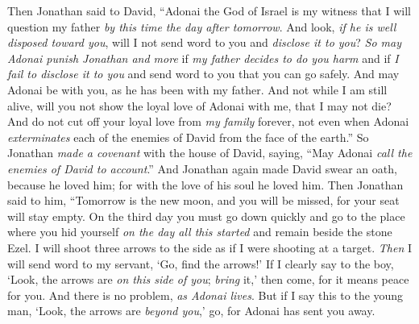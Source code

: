 \begin{biblechapter}
\verse Then Jonathan said to David, “Adonai the God of Israel is my witness that I will question my father \textit{by this time the day after tomorrow}. And look, \textit{if he is well disposed toward you}, will I not send word to you and \textit{disclose it to you}?
\verse \textit{So may Adonai punish Jonathan and more} if \textit{my father decides to do you harm} and if \textit{I fail to disclose it to you} and send word to you that you can go safely. And may Adonai be with you, as he has been with my father.
\verse And not while I am still alive, will you not show the loyal love of Adonai with me, that I may not die?
\verse And do not cut off your loyal love from \textit{my family} forever, not even when Adonai \textit{exterminates} each of the enemies of David from the face of the earth.”
\verse So Jonathan \textit{made a covenant} with the house of David, saying, “May Adonai \textit{call the enemies of David to account}.”
\verse And Jonathan again made David swear an oath, because he loved him; for with the love of his soul he loved him.
\verse Then Jonathan said to him, “Tomorrow is the new moon, and you will be missed, for your seat will stay empty.
\verse On the third day you must go down quickly and go to the place where you hid yourself \textit{on the day all this started} and remain beside the stone Ezel.
\verse I will shoot three arrows to the side as if I were shooting at a target.
\verse \textit{Then} I will send word to my servant, ‘Go, find the arrows!’ If I clearly say to the boy, ‘Look, the arrows are \textit{on this side of you}; \textit{bring} it,’ then come, for it means peace for you. And there is no problem, \textit{as Adonai lives}.
\verse But if I say this to the young man, ‘Look, the arrows are \textit{beyond you},’ go, for Adonai has sent you away.

\end{biblechapter}
